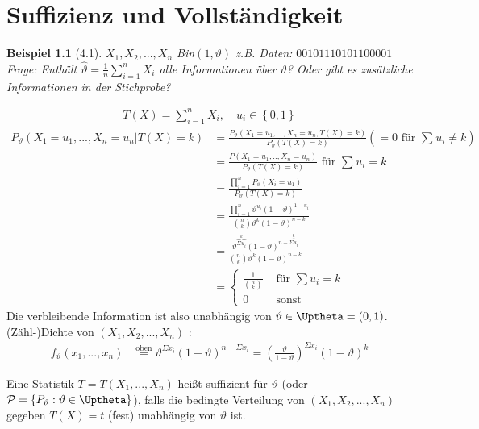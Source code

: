 \documentclass[a4paper,openany]{book}
\theoremstyle{mytheoremstyle}
\newtheorem*{bei}{Beispiel}
\theoremstyle{mytheoremstyle2}
\begin{document}
\chapter{Suffizienz und Vollständigkeit}
\begin{bei}[4.1]
  $X_1,X_2,...,X_n $ Bin$(1,\vartheta )$ z.B. Daten: $00101110101100001$ \\
  Frage: Enthält $\hat{\vartheta }=\frac{1}{n}\sum_{i=1}^{n}{X_i}$ alle Informationen über $\vartheta $? Oder gibt es zusätzliche Informationen in der Stichprobe?
\end{bei}
\begin{align*}
  T(X)=\sum_{i=1}^{n}{X_i}, \quad u_i \in \left\{0,1\right\}
\end{align*}
\begin{align*}
  P _{\vartheta }(X_1=u_1,...,X_n=u_n|T(X)=k)
  &=\frac{P _{\vartheta }(X_1=u_1,...,X_n=u_n,T(X)=k)}{P _{\vartheta }(T(X)=k)} (=0 \text{ für }\sum_{}^{}{u_i}\neq k)\\
  &=\frac{P(X_1=u_1,..,X_n=u_n)}{P _{\vartheta }(T(X)=k)} \text{ für }\sum_{}^{}{u_i}= k\\
  &=\frac{\prod_{i=1}^{n}{P _{\vartheta }(X_i=u_1)}}{P _{\vartheta }(T(X)=k)} \\
  &=\frac{\prod_{i=1}^{n}{\vartheta ^{u_i}(1-\vartheta )^{1-u_i}}}{\binom{n}{k}\vartheta ^k(1-\vartheta )^{n-k}} \\
  &=\frac{\vartheta ^{\overbrace{\Sigma u_i}^{k} }(1-\vartheta )^{n-\overbrace{\Sigma u_i}^{k} }}{\binom{n}{k}\vartheta ^k(1-\vartheta )^{n-k}} \\
  &=\begin{cases}
    \frac{1}{\binom{n}{k}} &\text{ für }\sum u_i=k\\
    0& \text{ sonst}
  \end{cases}
\end{align*}
Die verbleibende Information ist also unabhängig von $\vartheta \in \Uptheta=(0,1)$.  \\
(Zähl-)Dichte von $(X_1,X_2,...,X_n)$ :
\begin{align*}
  f _{\vartheta }(x_1,...,x_n)&\overset{\text{oben}}
  =\vartheta ^{\Sigma x_i}(1-\vartheta )^{n-\Sigma x_i}=\left(\frac{\vartheta }{1-\vartheta }\right)^{\Sigma x_i}(1-\vartheta )^k
\end{align*}
\begin{defi}{4.2}{}
  Eine Statistik $T=T(X_1,...,X_n)$ heißt \underline{suffizient} für $\vartheta $ (oder $\mathcal{P}=\left\{P _{\vartheta }:\vartheta \in \Uptheta\right\}$), falls die bedingte Verteilung von $(X_1,X_2,...,X_n)$ gegeben $T(X)=t$ (fest) unabhängig von $\vartheta $ ist.  
\end{defi}
\end{document}

